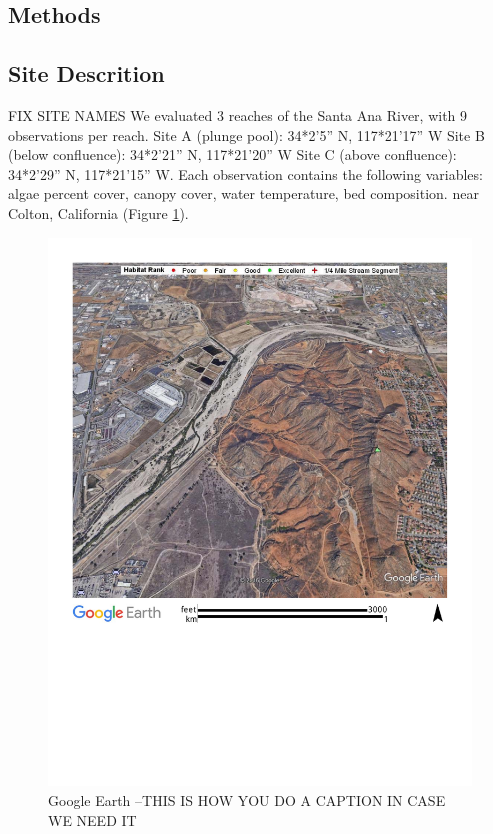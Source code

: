 \documentclass{article}
\begin{document}
\subsection{Methods}


\subsection{Site Descrition}

FIX SITE NAMES
We evaluated 3 reaches of the Santa Ana River, with 9 observations per reach. Site A (plunge pool): 34*2’5” N, 117*21’17” W Site B (below conﬂuence): 34*2’21” N, 117*21’20” W Site C (above conﬂuence): 34*2’29” N, 117*21’15” W. Each observation contains the following variables: algae percent cover, canopy cover, water temperature, bed composition. near Colton, California (Figure \ref{SAR_Image}). 

\begin{figure}
\includegraphics[width=1.00\textwidth]{Figures/SantaAna_SatelliteImage}
\caption{Google Earth --THIS IS HOW YOU DO A CAPTION IN CASE WE NEED IT}
\label{SAR_Image}
\end{figure}
\end{document}
